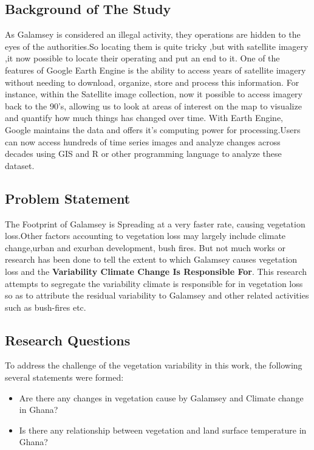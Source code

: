 \documentclass[
  onepage,
  openany]{scrbook}
\begin{document}
\hypertarget{background-of-the-study}{%
\subsection{Background of The Study}\label{background-of-the-study}}

As Galamsey is considered an illegal activity, they operations are
hidden to the eyes of the authorities.So locating them is quite tricky
,but with satellite imagery ,it now possible to locate their operating
and put an end to it. One of the features of Google Earth Engine is the
ability to access years of satellite imagery without needing to
download, organize, store and process this information. For instance,
within the Satellite image collection, now it possible to access imagery
back to the 90's, allowing us to look at areas of interest on the map to
visualize and quantify how much things has changed over time. With Earth
Engine, Google maintains the data and offers it's computing power for
processing.Users can now access hundreds of time series images and
analyze changes across decades using GIS and R or other programming
language to analyze these dataset.

\hypertarget{problem-statement}{%
\subsection{Problem Statement}\label{problem-statement}}

The Footprint of Galamsey is Spreading at a very faster rate, causing
vegetation loss.Other factors accounting to vegetation loss may largely
include climate change,urban and exurban development, bush fires. But
not much works or research has been done to tell the extent to which
Galamsey causes vegetation loss and the \textbf{Variability Climate
Change Is Responsible For}. This research attempts to segregate the
variability climate is responsible for in vegetation loss so as to
attribute the residual variability to Galamsey and other related
activities such as bush-fires etc.

\hypertarget{research-questions}{%
\subsection{Research Questions}\label{research-questions}}

To address the challenge of the vegetation variability in this work, the
following several statements were formed:

\begin{itemize}
\item
  Are there any changes in vegetation cause by Galamsey and Climate
  change in Ghana?
\item
  Is there any relationship between vegetation and land surface
  temperature in Ghana?
\end{itemize}
\end{document}
